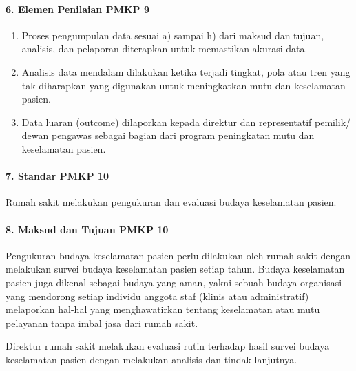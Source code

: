 \documentclass[
]{book}
\providecommand{\tightlist}{%
  \setlength{\itemsep}{0pt}\setlength{\parskip}{0pt}}
\begin{document}
\hypertarget{elemen-penilaian-pmkp-9}{%
\paragraph*{6. Elemen Penilaian PMKP 9}\label{elemen-penilaian-pmkp-9}}

\begin{enumerate}
\def\labelenumi{\alph{enumi}.}
\tightlist
\item
  Proses pengumpulan data sesuai a) sampai h) dari maksud dan tujuan, analisis, dan pelaporan diterapkan untuk memastikan akurasi data.
\item
  Analisis data mendalam dilakukan ketika terjadi tingkat, pola atau tren yang tak diharapkan yang digunakan untuk meningkatkan mutu dan keselamatan pasien.
\item
  Data luaran (outcome) dilaporkan kepada direktur dan representatif pemilik/ dewan pengawas sebagai bagian dari program peningkatan mutu dan keselamatan pasien.
\end{enumerate}

\hypertarget{standar-pmkp-10}{%
\paragraph*{7. Standar PMKP 10}\label{standar-pmkp-10}}

Rumah sakit melakukan pengukuran dan evaluasi budaya keselamatan pasien.

\hypertarget{maksud-dan-tujuan-pmkp-10}{%
\paragraph*{8. Maksud dan Tujuan PMKP 10}\label{maksud-dan-tujuan-pmkp-10}}

Pengukuran budaya keselamatan pasien perlu dilakukan oleh rumah sakit dengan melakukan survei budaya keselamatan pasien setiap tahun. Budaya keselamatan pasien juga dikenal sebagai budaya yang aman, yakni sebuah budaya organisasi yang mendorong setiap individu anggota staf (klinis atau administratif) melaporkan hal-hal yang menghawatirkan tentang keselamatan atau mutu pelayanan tanpa imbal jasa dari rumah sakit.

Direktur rumah sakit melakukan evaluasi rutin terhadap hasil survei budaya keselamatan pasien dengan melakukan analisis dan tindak lanjutnya.
\end{document}
